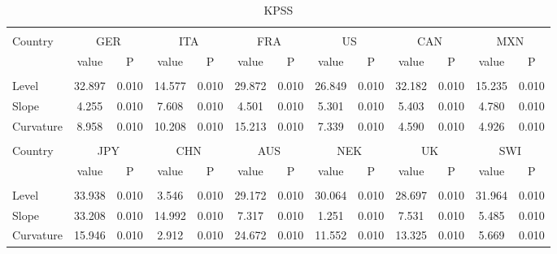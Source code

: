 \documentclass{article}
\begin{document}
\begin{table}[h]
\caption{KPSS} %
\fontsize{10}{10}\selectfont
\centering%
\begin{tabular}{l cc cc cc cc cc cc}%
\hline\hline \\ [-1.5ex]                         %

Country	&	\multicolumn{2}{c}{GER}			&	\multicolumn{2}{c}{ITA}			&	\multicolumn{2}{c}{FRA}			&	\multicolumn{2}{c}{US}			&	\multicolumn{2}{c}{CAN}			&	\multicolumn{2}{c}{MXN}			\\[0.5ex] 

 & value &P & value &P& value &P & value &P& value &P & value &P\\

\hline       \\ [-1.5ex] 

Level	&	32.897	&	0.010	&	14.577	&	0.010	&	29.872	&	0.010	&	26.849	&	0.010	&	32.182	&	0.010	&	15.235	&	0.010	\\
Slope	&	4.255	&	0.010	&	7.608	&	0.010	&	4.501	&	0.010	&	5.301	&	0.010	&	5.403	&	0.010	&	4.780	&	0.010	\\
\medskip
Curvature	&	8.958	&	0.010	&	10.208	&	0.010	&	15.213	&	0.010	&	7.339	&	0.010	&	4.590	&	0.010	&	4.926	&	0.010	\\


\hline\hline   \\ [-1.5ex]    

Country	&	\multicolumn{2}{c}{JPY}			&	\multicolumn{2}{c}{CHN}			&	\multicolumn{2}{c}{AUS}			&	\multicolumn{2}{c}{NEK}			&	\multicolumn{2}{c}{UK}			&	\multicolumn{2}{c}{SWI}			\\

 & value &P & value &P& value &P & value &P& value &P & value &P\\

\hline       \\ [-1.5ex] 

Level	&	33.938	&	0.010	&	3.546	&	0.010	&	29.172	&	0.010	&	30.064	&	0.010	&	28.697	&	0.010	&	31.964	&	0.010	\\
Slope	&	33.208	&	0.010	&	14.992	&	0.010	&	7.317	&	0.010	&	1.251	&	0.010	&	7.531	&	0.010	&	5.485	&	0.010	\\
\medskip
Curvature	&	15.946	&	0.010	&	2.912	&	0.010	&	24.672	&	0.010	&	11.552	&	0.010	&	13.325	&	0.010	&	5.669	&	0.010	\\


\hline   

\end{tabular}
\label{tab:hresult}
\end{table}
\end{document}
